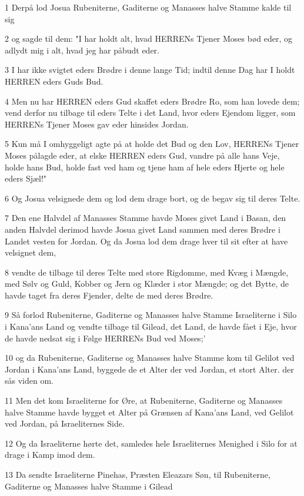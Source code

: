 \par 1 Derpå lod Josua Rubeniterne, Gaditerne og Manasses halve Stamme kalde til sig
\par 2 og sagde til dem: "I har holdt alt, hvad HERRENs Tjener Moses bød eder, og adlydt mig i alt, hvad jeg har påbudt eder.
\par 3 I har ikke svigtet eders Brødre i denne lange Tid; indtil denne Dag har I holdt HERREN eders Guds Bud.
\par 4 Men nu har HERREN eders Gud skaffet eders Brødre Ro, som han lovede dem; vend derfor nu tilbage til eders Telte i det Land, hvor eders Ejendom ligger, som HERRENs Tjener Moses gav eder hinsides Jordan.
\par 5 Kun må I omhyggeligt agte på at holde det Bud og den Lov, HERRENs Tjener Moses pålagde eder, at elske HERREN eders Gud, vandre på alle hans Veje, holde hans Bud, holde fast ved ham og tjene ham af hele eders Hjerte og hele eders Sjæl!"
\par 6 Og Josua velsignede dem og lod dem drage bort, og de begav sig til deres Telte.
\par 7 Den ene Halvdel af Manasses Stamme havde Moses givet Land i Basan, den anden Halvdel derimod havde Josua givet Land sammen med deres Brødre i Landet vesten for Jordan. Og da Josua lod dem drage hver til sit efter at have velsignet dem,
\par 8 vendte de tilbage til deres Telte med store Rigdomme, med Kvæg i Mængde, med Sølv og Guld, Kobber og Jern og Klæder i stor Mængde; og det Bytte, de havde taget fra deres Fjender, delte de med deres Brødre.
\par 9 Så forlod Rubeniterne, Gaditerne og Manasses halve Stamme Israeliterne i Silo i Kana'ans Land og vendte tilbage til Gilead, det Land, de havde fået i Eje, hvor de havde nedsat sig i Følge HERRENs Bud ved Moses;'
\par 10 og da Rubeniterne, Gaditerne og Manasses halve Stamme kom til Gelilot ved Jordan i Kana'ans Land, byggede de et Alter der ved Jordan, et stort Alter. der sås viden om.
\par 11 Men det kom Israeliterne for Øre, at Rubeniterne, Gaditerne og Manasses halve Stamme havde bygget et Alter på Grænsen af Kana'ans Land, ved Gelilot ved Jordan, på Israeliternes Side.
\par 12 Og da Israeliterne hørte det, samledes hele Israeliternes Menighed i Silo for at drage i Kamp imod dem.
\par 13 Da sendte Israeliterne Pinehas, Præsten Eleazars Søn, til Rubeniterne, Gaditerne og Manasses halve Stamme i Gilead
